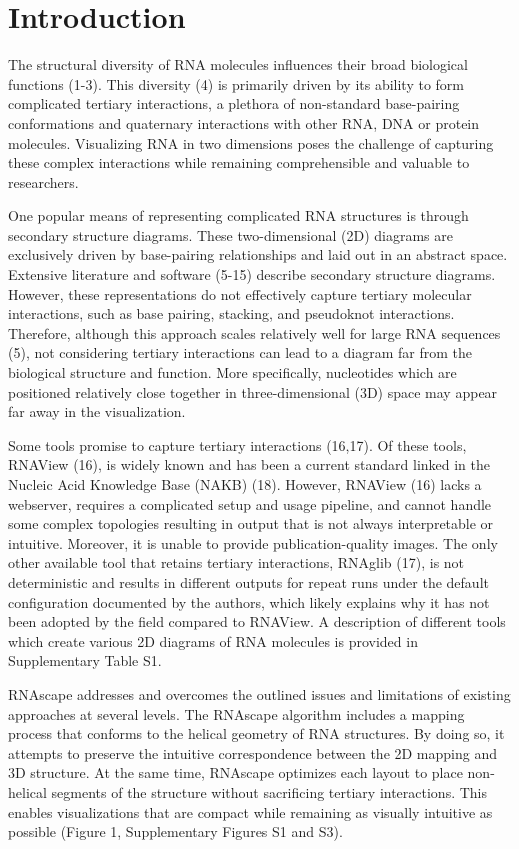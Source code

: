 \section{Introduction} 

The structural diversity of RNA molecules influences their broad biological functions (1-3). This diversity (4) is primarily driven by its ability to form complicated tertiary interactions, a plethora of non-standard base-pairing conformations and quaternary interactions with other RNA, DNA or protein molecules. Visualizing RNA in two dimensions poses the challenge of capturing these complex interactions while remaining comprehensible and valuable to researchers.
\par
One popular means of representing complicated RNA structures is through secondary structure diagrams. These two-dimensional (2D) diagrams are exclusively driven by base-pairing relationships and laid out in an abstract space. Extensive literature and software (5-15) describe secondary structure diagrams. However, these representations do not effectively capture tertiary molecular interactions, such as base pairing, stacking, and pseudoknot interactions. Therefore, although this approach scales relatively well for large RNA sequences (5), not considering tertiary interactions can lead to a diagram far from the biological structure and function. More specifically, nucleotides which are positioned relatively close together in three-dimensional (3D) space may appear far away in the visualization.
\par
Some tools promise to capture tertiary interactions (16,17). Of these tools, RNAView (16), is widely known and has been a current standard linked in the Nucleic Acid Knowledge Base (NAKB) (18). However, RNAView (16) lacks a webserver, requires a complicated setup and usage pipeline, and cannot handle some complex topologies resulting in output that is not always interpretable or intuitive. Moreover, it is unable to provide publication-quality images. The only other available tool that retains tertiary interactions, RNAglib (17), is not deterministic and results in different outputs for repeat runs under the default configuration documented by the authors, which likely explains why it has not been adopted by the field compared to RNAView. A description of different tools which create various 2D diagrams of RNA molecules is provided in Supplementary Table S1.
\par
RNAscape addresses and overcomes the outlined issues and limitations of existing approaches at several levels. The RNAscape algorithm includes a mapping process that conforms to the helical geometry of RNA structures. By doing so, it attempts to preserve the intuitive correspondence between the 2D mapping and 3D structure. At the same time, RNAscape optimizes each layout to place non-helical segments of the structure without sacrificing tertiary interactions. This enables visualizations that are compact while remaining as visually intuitive as possible (Figure 1, Supplementary Figures S1 and S3).
